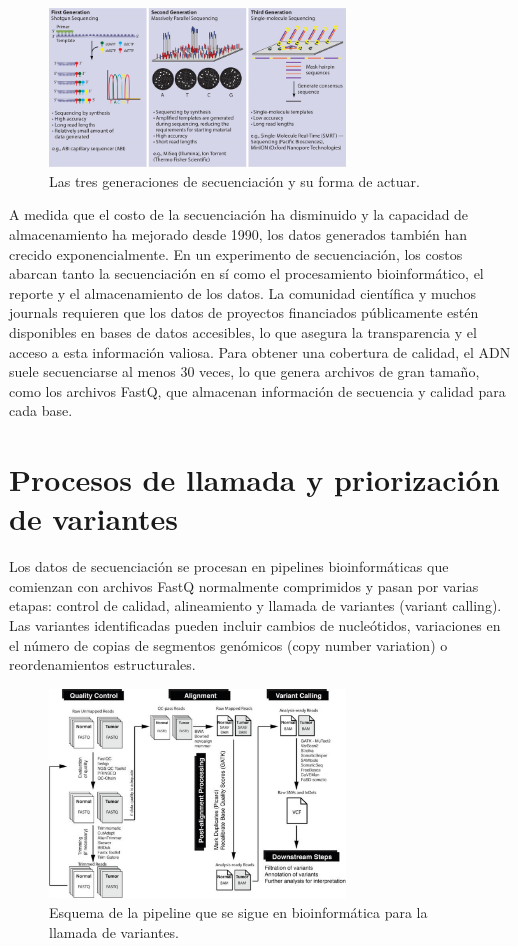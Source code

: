 \begin{figure}[htbp]
\centering
\includegraphics[width = 0.7\textwidth]{figs/sequencing-generations.png}
\caption{Las tres generaciones de secuenciación y su forma de actuar.}
\end{figure}

A medida que el costo de la secuenciación ha disminuido y la capacidad de almacenamiento ha mejorado desde 1990, los datos generados también han crecido exponencialmente. En un experimento de secuenciación, los costos abarcan tanto la secuenciación en sí como el procesamiento bioinformático, el reporte y el almacenamiento de los datos. La comunidad científica y muchos journals requieren que los datos de proyectos financiados públicamente estén disponibles en bases de datos accesibles, lo que asegura la transparencia y el acceso a esta información valiosa. Para obtener una cobertura de calidad, el ADN suele secuenciarse al menos 30 veces, lo que genera archivos de gran tamaño, como los archivos FastQ, que almacenan información de secuencia y calidad para cada base.

\section{Procesos de llamada y priorización de variantes}
Los datos de secuenciación se procesan en pipelines bioinformáticas que comienzan con archivos FastQ normalmente comprimidos y pasan por varias etapas: control de calidad, alineamiento y llamada de variantes (variant calling). Las variantes identificadas pueden incluir cambios de nucleótidos, variaciones en el número de copias de segmentos genómicos (copy number variation) o reordenamientos estructurales.

\begin{figure}[htbp]
\centering
\includegraphics[width = 0.7\textwidth]{figs/bioinfo-pipeline.png}
\caption{Esquema de la pipeline que se sigue en bioinformática para la llamada de variantes.}
\end{figure}


